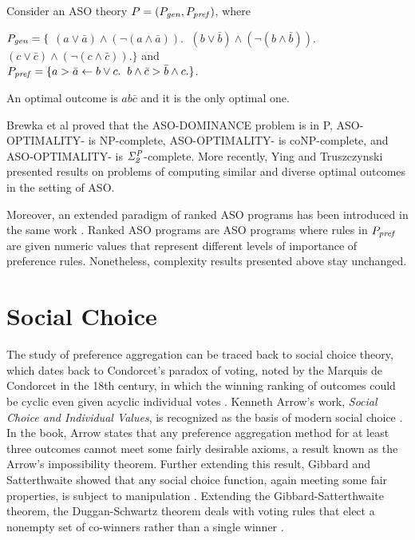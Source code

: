 Consider an ASO theory $P=(P_{\mathit{gen}}, P_{\mathit{pref}})$, where
\begin{center}
	$P_{\mathit{gen}}=\{$
	$(a \lor \bar{a}) \land (\neg (a \land \bar{a})). \;$
	$(b \lor \bar{b}) \land (\neg (b \land \bar{b})). \;$
	$(c \lor \bar{c}) \land (\neg (c \land \bar{c})). \}$
	and\\
	$P_{\mathit{pref}}=\{
		a > \bar{a} \leftarrow b \vee c. \;\;
		b \wedge \bar{c} > \bar{b} \wedge c.
	\}$.
\end{center}
An optimal outcome is $ab\bar{c}$ and it is the only optimal one.

Brewka et al \cite{Brewka03answerset} proved that
the ASO-DOMINANCE problem is in P, ASO-OPTIMALITY-
is NP-complete, ASO-OPTIMALITY- is coNP-complete,
and ASO-OPTIMALITY- is $\mathit{\Sigma^P_{2}}$-complete.
More recently, Ying and Truszczynski \cite{ZhuT13,}
presented results on problems of computing similar and
diverse optimal outcomes in the setting of ASO.

Moreover, an extended paradigm of ranked ASO programs has
been introduced in the same work \cite{Brewka03answerset}.
Ranked ASO programs are ASO programs where rules in $P_{\mathit{pref}}$
are given numeric values that represent different levels of importance
of preference rules.  Nonetheless, complexity results presented
above stay unchanged.




\section{Social Choice}
The study of preference aggregation can be traced back to social choice theory,
which dates back to Condorcet's paradox of voting, noted by the
Marquis de Condorcet in the 18th century, in which
the winning ranking of outcomes could be cyclic even 
given acyclic individual votes \cite{wiki:soc}.
Kenneth Arrow's work, \textit{Social Choice and Individual Values},
is recognized as the basis of modern social choice \cite{aarrow:b:socialchoice}.
In the book, Arrow states that any preference aggregation method for at least three
outcomes cannot meet some fairly desirable axioms, a result known as
the Arrow's impossibility theorem.
Further extending this result, Gibbard and Satterthwaite showed
that any social choice function, again meeting some fair properties, is subject
to manipulation \cite{gib:j:maip-scheme,satt:j:strat-proof}.
Extending the Gibbard-Satterthwaite theorem, the Duggan-Schwartz theorem deals with 
voting rules that elect a nonempty set of co-winners rather than a single winner
\cite{dug-sch:j:maipres}.

